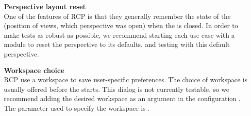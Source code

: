 
\textbf{Perspective layout reset}\\
One of the features of RCP \gdauts{} is that they generally remember the state of the \gdaut{} (position of views, which perspective was open) when the \gdaut{} is closed. In order to make tests as robust as possible, we recommend starting each use case with a module to reset the perspective to its defaults, and testing with this default perspective. 

\textbf{Workspace choice}\\
RCP \gdauts{} use a workspace to save user-specific preferences. The choice of workspace is usually offered before the \gdaut{} starts. This dialog is not currently testable, so we recommend adding the desired workspace as an \gdaut{} argument in the \gdaut{} configuration . The parameter used to specify the workspace is .
